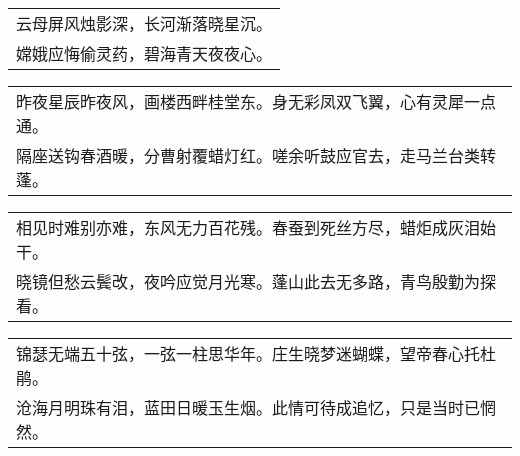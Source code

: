 \nopagebreak%
\nopagebreak%
\noindent\begin{minipage}{\linewidth}
  \vskip-3pt\begin{table}[H]
    \centering
    \begin{tabular}{@{}l@{}}
云母屏风烛影深，长河渐落晓星沉。\\
嫦娥应悔偷灵药，碧海青天夜夜心。
    \end{tabular}
  \end{table}
\end{minipage}
\vspace{1cm}


\nopagebreak%
\nopagebreak%
\noindent\begin{minipage}{\linewidth}
  \vskip-3pt\begin{table}[H]
    \centering
    \begin{tabular}{@{}l@{}}
昨夜星辰昨夜风，画楼西畔桂堂东。身无彩凤双飞翼，心有灵犀一点通。\\
隔座送钩春酒暖，分曹射覆蜡灯红。嗟余听鼓应官去，走马兰台类转蓬。
    \end{tabular}
  \end{table}
\end{minipage}
\vspace{1cm}


\nopagebreak%
\nopagebreak%
\noindent\begin{minipage}{\linewidth}
  \vskip-3pt\begin{table}[H]
    \centering
    \begin{tabular}{@{}l@{}}
相见时难别亦难，东风无力百花残。春蚕到死丝方尽，蜡炬成灰泪始干。\\
晓镜但愁云鬓改，夜吟应觉月光寒。蓬山此去无多路，青鸟殷勤为探看。
    \end{tabular}
  \end{table}
\end{minipage}
\vspace{1cm}


\nopagebreak%
\nopagebreak%
\noindent\begin{minipage}{\linewidth}
  \vskip-3pt\begin{table}[H]
    \centering
    \begin{tabular}{@{}l@{}}
锦瑟无端五十弦，一弦一柱思华年。庄生晓梦迷蝴蝶，望帝春心托杜鹃。\\
沧海月明珠有泪，蓝田日暖玉生烟。此情可待成追忆，只是当时已惘然。
    \end{tabular}
  \end{table}
\end{minipage}
\vspace{1cm}


